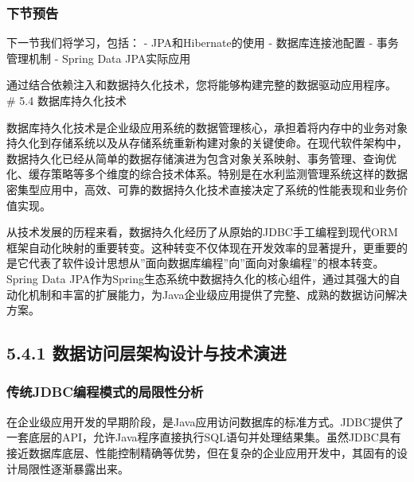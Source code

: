 \hypertarget{ux4e0bux8282ux9884ux544a-2}{%
\subsubsection{下节预告}\label{ux4e0bux8282ux9884ux544a-2}}

下一节我们将学习，包括： - JPA和Hibernate的使用 - 数据库连接池配置 - 事务管理机制 - Spring Data JPA实际应用

通过结合依赖注入和数据持久化技术，您将能够构建完整的数据驱动应用程序。 \# 5.4 数据库持久化技术

数据库持久化技术是企业级应用系统的数据管理核心，承担着将内存中的业务对象持久化到存储系统以及从存储系统重新构建对象的关键使命。在现代软件架构中，数据持久化已经从简单的数据存储演进为包含对象关系映射、事务管理、查询优化、缓存策略等多个维度的综合技术体系。特别是在水利监测管理系统这样的数据密集型应用中，高效、可靠的数据持久化技术直接决定了系统的性能表现和业务价值实现。

从技术发展的历程来看，数据持久化经历了从原始的JDBC手工编程到现代ORM框架自动化映射的重要转变。这种转变不仅体现在开发效率的显著提升，更重要的是它代表了软件设计思想从''面向数据库编程''向''面向对象编程''的根本转变。Spring Data JPA作为Spring生态系统中数据持久化的核心组件，通过其强大的自动化机制和丰富的扩展能力，为Java企业级应用提供了完整、成熟的数据访问解决方案。

\hypertarget{ux6570ux636eux8bbfux95eeux5c42ux67b6ux6784ux8bbeux8ba1ux4e0eux6280ux672fux6f14ux8fdb}{%
\subsection{5.4.1 数据访问层架构设计与技术演进}\label{ux6570ux636eux8bbfux95eeux5c42ux67b6ux6784ux8bbeux8ba1ux4e0eux6280ux672fux6f14ux8fdb}}

\hypertarget{ux4f20ux7edfjdbcux7f16ux7a0bux6a21ux5f0fux7684ux5c40ux9650ux6027ux5206ux6790}{%
\subsubsection{传统JDBC编程模式的局限性分析}\label{ux4f20ux7edfjdbcux7f16ux7a0bux6a21ux5f0fux7684ux5c40ux9650ux6027ux5206ux6790}}

在企业级应用开发的早期阶段，是Java应用访问数据库的标准方式。JDBC提供了一套底层的API，允许Java程序直接执行SQL语句并处理结果集。虽然JDBC具有接近数据库底层、性能控制精确等优势，但在复杂的企业应用开发中，其固有的设计局限性逐渐暴露出来。

